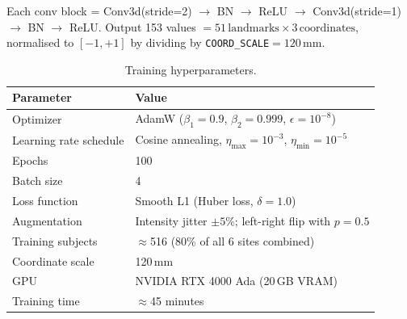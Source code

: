 \documentclass[11pt,letterpaper]{article}
\begin{document}
Each conv block = Conv3d(stride=2) $\to$ BN $\to$ ReLU $\to$ Conv3d(stride=1) $\to$ BN $\to$ ReLU.
Output 153 values $= 51\,\text{landmarks} \times 3\,\text{coordinates}$, normalised to $[-1, +1]$
by dividing by \texttt{COORD\_SCALE}$= 120\,\text{mm}$.

\begin{table}[h]
\centering
\caption{Training hyperparameters.}
\small
\begin{tabular}{ll}
\toprule
\textbf{Parameter} & \textbf{Value} \\
\midrule
Optimizer & AdamW ($\beta_1=0.9$, $\beta_2=0.999$, $\epsilon=10^{-8}$) \\
Learning rate schedule & Cosine annealing, $\eta_\text{max}=10^{-3}$, $\eta_\text{min}=10^{-5}$ \\
Epochs & 100 \\
Batch size & 4 \\
Loss function & Smooth L1 (Huber loss, $\delta=1.0$) \\
Augmentation & Intensity jitter $\pm5\%$; left-right flip with $p=0.5$ \\
Training subjects & $\approx$516 (80\% of all 6 sites combined) \\
Coordinate scale & 120\,mm \\
GPU & NVIDIA RTX 4000 Ada (20\,GB VRAM) \\
Training time & $\approx$45 minutes \\
\bottomrule
\end{tabular}
\end{table}
\end{document}
